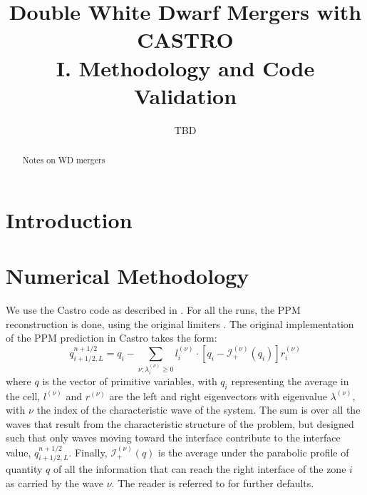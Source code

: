 \documentclass[12pt,preprint]{aastex}
\begin{document}
\title{Double White Dwarf Mergers with CASTRO\\ I. Methodology and Code Validation}


\author{TBD}
\begin{abstract}
Notes on WD mergers
\end{abstract}

\section{Introduction}



\section{Numerical Methodology}\label{sec:Numerical Methodology}

We use the Castro code as described in \citet{castro}.  For all the runs,
the PPM reconstruction is done, using the original limiters \citep{ppm}.
The original implementation of the PPM prediction in Castro takes the
form:
\begin{equation}
q_{i+1/2,L}^{n+1/2} = q_i -
   \sum_{\nu;\lambda_i^{(\nu)}\ge 0} l_i^{(\nu)} \cdot \left [
        q_i - \mathcal{I}_+^{(\nu)}(q_i)
       \right ] r_i^{(\nu)}
\end{equation}
where $q$ is the vector of primitive variables, with $q_i$
representing the average in the cell, $l^{(\nu)}$ and $r^{(\nu)}$ are
the left and right eigenvectors with eigenvalue $\lambda^{(\nu)}$,
with $\nu$ the index of the characteristic wave of the system.  The
sum is over all the waves that result from the characteristic
structure of the problem, but designed such that only waves moving
toward the interface contribute to the interface value,
$q_{i+1/2,L}^{n+1/2}$.  Finally, $\mathcal{I}_+^{(\nu)}(q)$ is the
average under the parabolic profile of quantity $q$ of all the information
that can reach the right interface of the zone $i$ as carried by the wave
$\nu$.   The reader is referred to
\citet{ppmunsplit} for further defaults.
\end{document}
